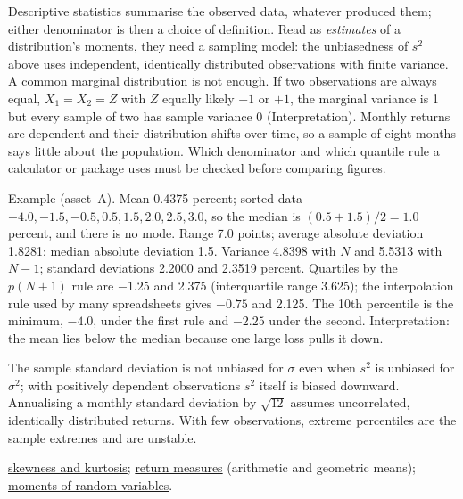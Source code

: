 \begin{qfdefinition}
 Descriptive statistics summarise the observed data, whatever produced them; either denominator is then a choice of definition. Read as \emph{estimates} of a distribution's moments, they need a sampling model: the unbiasedness of $s^2$ above uses independent, identically distributed observations with finite variance. A common marginal distribution is not enough. If two observations are always equal, $X_1=X_2=Z$ with $Z$ equally likely $-1$ or $+1$, the marginal variance is 1 but every sample of two has sample variance 0 (Interpretation). Monthly returns are dependent and their distribution shifts over time, so a sample of eight months says little about the population. Which denominator and which quantile rule a calculator or package uses must be checked before comparing figures.

 Example (asset~A). Mean 0.4375 percent; sorted data $-4.0,-1.5,-0.5,0.5,1.5,2.0,2.5,3.0$, so the median is $(0.5+1.5)/2=1.0$ percent, and there is no mode. Range 7.0 points; average absolute deviation 1.8281; median absolute deviation 1.5. Variance 4.8398 with $N$ and 5.5313 with $N-1$; standard deviations 2.2000 and 2.3519 percent. Quartiles by the $p(N+1)$ rule are $-1.25$ and 2.375 (interquartile range 3.625); the interpolation rule used by many spreadsheets gives $-0.75$ and 2.125. The 10th percentile is the minimum, $-4.0$, under the first rule and $-2.25$ under the second. Interpretation: the mean lies below the median because one large loss pulls it down.

 The sample standard deviation is not unbiased for $\sigma$ even when $s^2$ is unbiased for $\sigma^2$; with positively dependent observations $s^2$ itself is biased downward. Annualising a monthly standard deviation by $\sqrt{12}$ assumes uncorrelated, identically distributed returns. With few observations, extreme percentiles are the sample extremes and are unstable.

 \hyperref[def:return-shape-statistics]{skewness and kurtosis}; \hyperref[def:return-measures]{return measures} (arithmetic and geometric means); \hyperref[def:conditional-moments]{moments of random variables}.

\end{qfdefinition}

